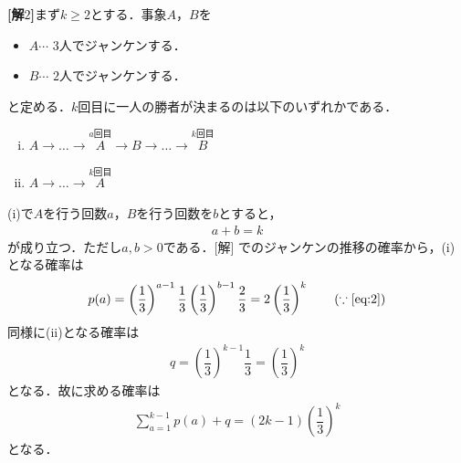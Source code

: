\documentclass[../../main.tex]{subfiles}
\begin{document}
{\bf[解$2$]}まず$k\ge2$とする．事象$A$，$B$を
\begin{itemize}
  \item $A\cdots$  $3$人でジャンケンする．
  \item $B\cdots$  $2$人でジャンケンする．
\end{itemize}
と定める．$k$回目に一人の勝者が決まるのは以下のいずれかである．
\begin{enumerate}[(i)]
  \item $A\to \dots\to \stackrel{a回目}{A}\to B\to \dots \to \stackrel{k回目}{B}$
  \item $A\to\dots\to \stackrel{k回目}{A}$
\end{enumerate}
(i)で$A$を行う回数$a$，$B$を行う回数を$b$とすると，
\begin{align}
  a+b=k\label{eq:2}
\end{align}
が成り立つ．ただし$a,b>0$である．[解] でのジャンケンの推移の確率から，(i)となる確率は
\begin{align}
  p(a)=\left(\dfrac{1}{3}\right)^{a-1}\dfrac{1}{3}\left(\dfrac{1}{3}\right)^{b-1}\dfrac{2}{3}%
  =2\left(\dfrac{1}{3}\right)^k\tag{$\because\cref{eq:2}$}
\end{align}
同様に(ii)となる確率は
\begin{align}
  q=\left(\dfrac{1}{3}\right)^{k-1}\dfrac{1}{3}=\left(\dfrac{1}{3}\right)^k
\end{align}
となる．故に求める確率は
\begin{align}
  \sum_{a=1}^{k-1}p(a)+q=(2k-1)\left(\dfrac{1}{3}\right)^k \tag{答}
\end{align}
となる．
\newpage
\end{document}
